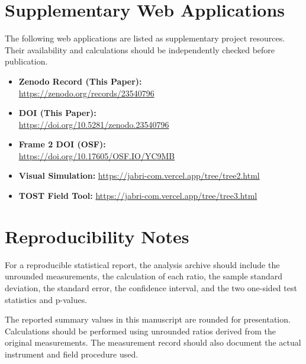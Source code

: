 \documentclass[11pt,a4paper]{article}
\begin{document}
\appendix

\section{Supplementary Web Applications}

The following web applications are listed as supplementary
project resources. Their availability and calculations should
be independently checked before publication.

\begin{itemize}
    \item \textbf{Zenodo Record (This Paper):} \\
    \url{https://zenodo.org/records/23540796}

    \item \textbf{DOI (This Paper):} \\
    \url{https://doi.org/10.5281/zenodo.23540796}

    \item \textbf{Frame 2 DOI (OSF):} \\
    \url{https://doi.org/10.17605/OSF.IO/YC9MB}

    \item \textbf{Visual Simulation:}
    \url{https://jabri-com.vercel.app/tree/tree2.html}

    \item \textbf{TOST Field Tool:}
    \url{https://jabri-com.vercel.app/tree/tree3.html}
\end{itemize}

\section{Reproducibility Notes}

For a reproducible statistical report, the analysis archive
should include the unrounded measurements, the calculation
of each ratio, the sample standard deviation, the standard
error, the confidence interval, and the two one-sided
test statistics and p-values.

The reported summary values in this manuscript are rounded
for presentation. Calculations should be performed using
unrounded ratios derived from the original measurements.
The measurement record should also document the actual
instrument and field procedure used.
\end{document}
